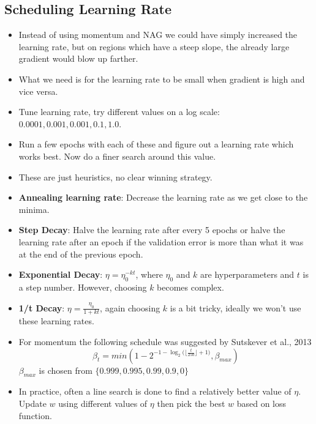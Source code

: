 \documentclass[a4paper]{article}
\begin{document}
\subsection{Scheduling Learning Rate}
\begin{itemize}
    \item Instead of using momentum and NAG we could have simply increased the learning rate, but on regions which have a steep slope, the already large gradient would blow up farther.
    \item What we need is for the learning rate to be small when gradient is high and vice versa.
    \item Tune learning rate, try different values on a log scale: $0.0001, 0.001, 0.001, 0.1, 1.0$.
    \item Run a few epochs with each of these and figure out a learning rate which works best. Now do a finer search around this value.
    \item These are just heuristics, no clear winning strategy.
    \item \textbf{Annealing learning rate}: Decrease the learning rate as we get close to the minima.
    \item \textbf{Step Decay}: Halve the learning rate after every 5 epochs or halve the learning rate after an epoch if the validation error is more than what it was at the end of the previous epoch.
    \item \textbf{Exponential Decay}: $\eta = \eta_0^{-kt}$, where $\eta_0$ and $k$ are hyperparameters and $t$ is a step number. However, choosing $k$ becomes complex.
    \item \textbf{1/t Decay}: $\eta = \frac{\eta_0}{1+kt}$, again choosing $k$ is a bit tricky, ideally we won't use these learning rates.
    \item For momentum the following schedule was suggested by Sutskever et al., 2013
    \begin{equation*}
        \beta_t = min(1-2^{-1-\log_2{(\lfloor \frac{t}{250}\rfloor+1})},\beta_{max})
    \end{equation*}
    $\beta_{max}$ is chosen from $\{0.999,0.995,0.99,0.9,0\}$
    \item In practice, often a line search is done to find a relatively better value of $\eta$. Update $w$ using different values of $\eta$ then pick the best $w$ based on loss function.
\end{itemize}
\end{document}
